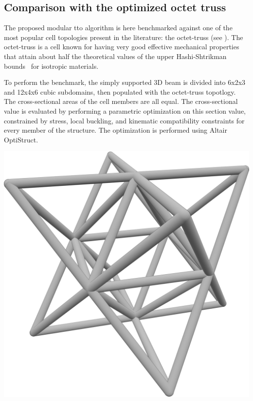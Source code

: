 \subsection{Comparison with the optimized octet truss}

The proposed modular \gls{tto} algorithm is here benchmarked against one of the most popular cell topologies present in the literature: the octet-truss (see ). The octet-truss is a cell known for having very good effective mechanical properties that attain about half the theoretical values of the upper Hashi-Shtrikman bounds~ for isotropic materials. 

To perform the benchmark, the simply supported 3D beam is divided into 6x2x3 and 12x4x6 cubic subdomains, then populated with the octet-truss topotlogy. The cross-sectional areas of the cell members are all equal. The cross-sectional value is evaluated by performing a parametric optimization on this section value, constrained by stress, local buckling, and kinematic compatibility constraints for every member of the structure. The optimization is performed using Altair OptiStruct.

\begin{marginfigure}
    \centering
    \includegraphics[width=0.7\linewidth]{figures/05_cellular_opt/00_octet/05_Cell__Topology_NLP_iso.png}
    \caption{}
    \label{fig:05_octet_module}
\end{marginfigure}

